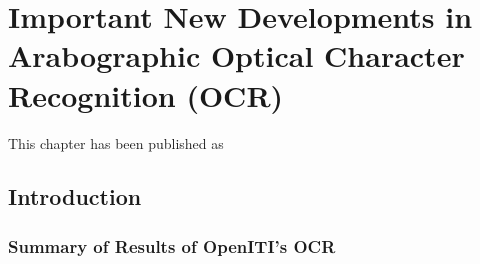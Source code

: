 ﻿\chapter{Important New Developments in Arabographic Optical Character Recognition (OCR)}
\thispagestyle{empty}
\vfill
This chapter has been published as 
\newpage
\nocite{soa0}
\nocite{soa1}
\nocite{soa2}
\nocite{soa3}
\nocite{soa4}
\nocite{soa5}
\nocite{soa6}

\section{Introduction}

\subsection{Summary of Results of OpenITI’s OCR}

